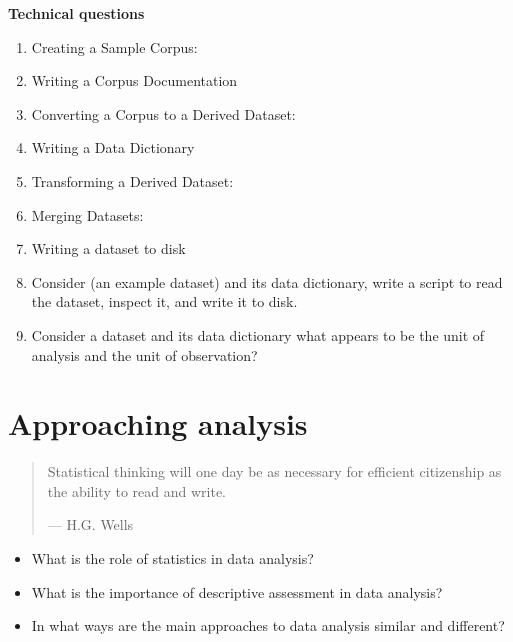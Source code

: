 \documentclass[
  letterpaper,
]{latex/krantz}
\providecommand{\tightlist}{%
  \setlength{\itemsep}{0pt}\setlength{\parskip}{0pt}}\usepackage{longtable,booktabs,array}
\begin{document}
\begin{tcolorbox}[enhanced jigsaw, arc=.35mm, leftrule=.75mm, rightrule=.15mm, opacityback=0, colback=white, breakable, bottomrule=.15mm, left=2mm, toprule=.15mm]

\textbf{Technical questions}

\begin{enumerate}
\def\labelenumi{\arabic{enumi}.}
\tightlist
\item
  Creating a Sample Corpus:
\item
  Writing a Corpus Documentation
\item
  Converting a Corpus to a Derived Dataset:
\item
  Writing a Data Dictionary
\item
  Transforming a Derived Dataset:
\item
  Merging Datasets:
\item
  Writing a dataset to disk
\item
  Consider (an example dataset) and its data dictionary, write a script
  to read the dataset, inspect it, and write it to disk.
\item
  Consider a dataset and its data dictionary what appears to be the unit
  of analysis and the unit of observation?
\end{enumerate}

\end{tcolorbox}

\hypertarget{sec-approaching-analysis}{%
\chapter{Approaching analysis}\label{sec-approaching-analysis}}

\begin{quote}
Statistical thinking will one day be as necessary for efficient
citizenship as the ability to read and write.

--- H.G. Wells
\end{quote}

\begin{tcolorbox}[enhanced jigsaw, colframe=quarto-callout-note-color-frame, titlerule=0mm, coltitle=black, colback=white, opacitybacktitle=0.6, colbacktitle=quarto-callout-note-color!10!white, left=2mm, arc=.35mm, leftrule=.75mm, rightrule=.15mm, bottomtitle=1mm, toptitle=1mm, breakable, bottomrule=.15mm, title=\textcolor{quarto-callout-note-color}{\faInfo}\hspace{0.5em}{Keys}, toprule=.15mm, opacityback=0]

\begin{itemize}
\tightlist
\item
  What is the role of statistics in data analysis?
\item
  What is the importance of descriptive assessment in data analysis?
\item
  In what ways are the main approaches to data analysis similar and
  different?
\end{itemize}

\end{tcolorbox}
\end{document}
